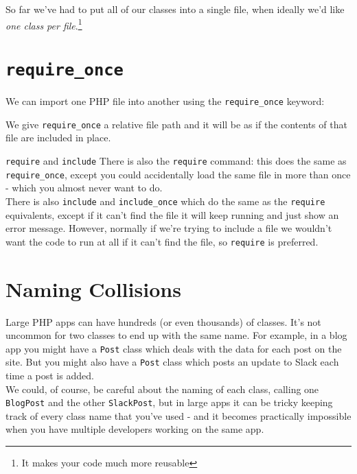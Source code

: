 So far we've had to put all of our classes into a single file, when ideally we'd like \textit{one class per file}.\footnote{It makes your code much more reusable}

\section{\texttt{require\_once}}

We can import one PHP file into another using the \texttt{require\_once} keyword:


We give \texttt{require\_once} a relative file path and it will be as if the contents of that file are included in place.
\\

\begin{infobox}{\texttt{require} and \texttt{include}}
    There is also the \texttt{require} command: this does the same as \texttt{require\_once}, except you could accidentally load the same file in more than once - which you almost never want to do.
    \\

    There is also \texttt{include} and \texttt{include\_once} which do the same as the \texttt{require} equivalents, except if it can't find the file it will keep running and just show an error message. However, normally if we're trying to include a file we wouldn't want the code to run at all if it can't find the file, so \texttt{require} is preferred.
\end{infobox}



\section{Naming Collisions}

Large PHP apps can have hundreds (or even thousands) of classes. It's not uncommon for two classes to end up with the same name. For example, in a blog app you might have a \texttt{Post} class which deals with the data for each post on the site. But you might also have a \texttt{Post} class which posts an update to Slack each time a post is added.
\\

We could, of course, be careful about the naming of each class, calling one \texttt{BlogPost} and the other \texttt{SlackPost}, but in large apps it can be tricky keeping track of every class name that you've used - and it becomes practically impossible when you have multiple developers working on the same app.
\\

